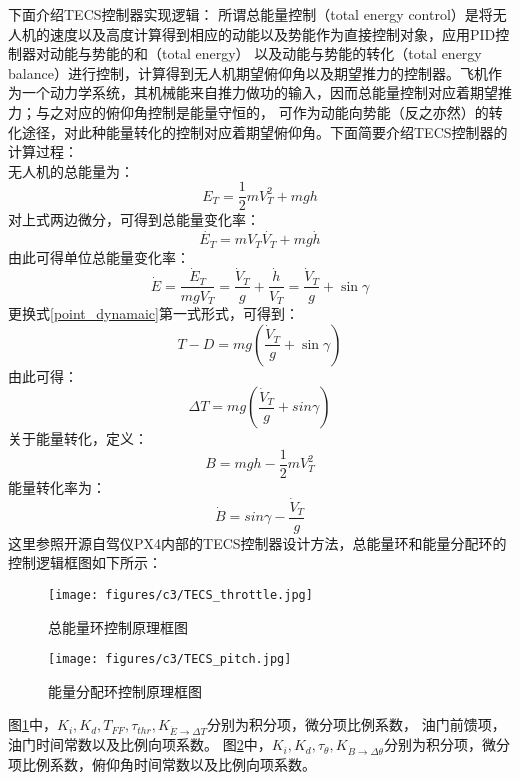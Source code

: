 下面介绍TECS控制器实现逻辑：
所谓总能量控制（total energy control）是将无人机的速度以及高度计算得到相应的动能以及势能作为直接控制对象，应用PID控制器对动能与势能的和（total energy）
以及动能与势能的转化（total energy balance）进行控制，计算得到无人机期望俯仰角以及期望推力的控制器。飞机作为一个动力学系统，其机械能来自推力做功的输入，因而总能量控制对应着期望推力；与之对应的俯仰角控制是能量守恒的，
可作为动能向势能（反之亦然）的转化途径，对此种能量转化的控制对应着期望俯仰角。下面简要介绍TECS控制器的计算过程：
\\
无人机的总能量为：
\begin{equation}
    E_T=\frac{1}{2}mV_T^2+mgh
    \label{ET}
\end{equation}
对上式两边微分，可得到总能量变化率：
\begin{equation}
    \dot{E_T}=mV_T\dot{V_T}+mg\dot{h}
    \label{ET_rate}
\end{equation}
由此可得单位总能量变化率：
\begin{equation}
    \dot{E}=\frac{\dot{E}_{T}}{m g V_{T}}=\frac{\dot{V}_{T}}{g}+\frac{\dot{h}}{V_{T}}=\frac{\dot{V}_{T}}{g}+\sin \gamma
    \label{specif_ET_rate}
\end{equation}
更换式\ref{point_dynamaic}第一式形式，可得到：
\begin{equation}
    T-D=m g\left(\frac{\dot{V}_{T}}{g}+\sin \gamma\right)
    \label{point_dynamaic_change}
\end{equation}
由此可得：
\begin{equation}
    \Delta T=m g\left(\frac{\dot{V}_{T}}{g}+sin\gamma\right)
    \label{thrust}
\end{equation}
关于能量转化，定义：
\begin{equation}
    B=m g h-\frac{1}{2} m V_{T}^{2}
\end{equation}
能量转化率为：
\begin{equation}
\dot{B}=sin\gamma-\frac{\dot{V}_{T}}{g}
\end{equation}
这里参照开源自驾仪PX4内部的TECS控制器设计方法，总能量环和能量分配环的控制逻辑框图如下所示：
\begin{figure}[H]
    \centering
    \texttt{[image: figures/c3/TECS\_throttle.jpg]}
    \caption{总能量环控制原理框图}\label{fig:total_energy}
\end{figure}
\begin{figure}[H]
    \centering
    \texttt{[image: figures/c3/TECS\_pitch.jpg]}
    \caption{能量分配环控制原理框图}\label{fig:balance_energy}
\end{figure}
图\ref{fig:total_energy}中，$K_i,K_d,T_{FF},\tau_{thr},K_{\dot{E}\rightarrow\Delta T}$分别为积分项，微分项比例系数，
油门前馈项，油门时间常数以及比例向项系数。
图\ref{fig:balance_energy}中，$K_i,K_d,\tau_{\theta},K_{\dot{B}\rightarrow\Delta \theta}$分别为积分项，微分项比例系数，俯仰角时间常数以及比例向项系数。


